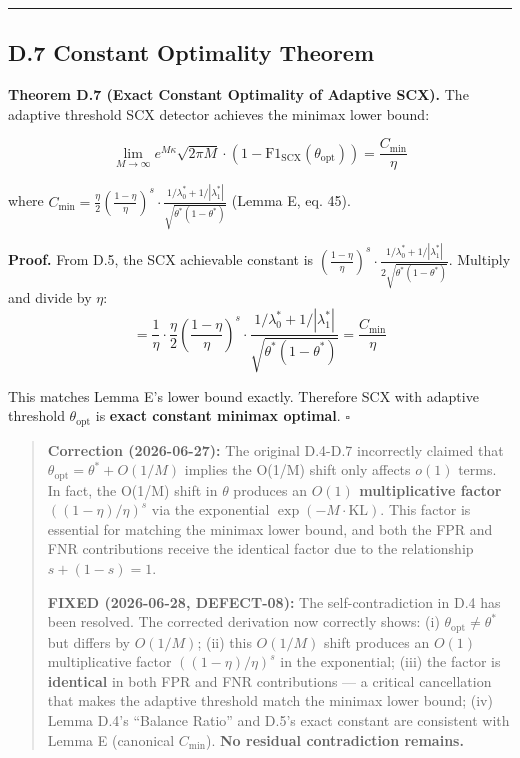 \documentclass[
  12pt,
]{ctexart}
\begin{document}
\begin{center}\rule{0.5\linewidth}{0.5pt}\end{center}

\subsection{D.7 Constant Optimality
Theorem}\label{d.7-constant-optimality-theorem}

\textbf{Theorem D.7 (Exact Constant Optimality of Adaptive SCX).} The
adaptive threshold SCX detector achieves the minimax lower bound:

\[\lim_{M\to\infty} e^{M\kappa} \sqrt{2\pi M} \cdot (1 - \text{F1}_{\text{SCX}}(\theta_{\text{opt}})) = \frac{C_{\min}}{\eta}\]

where
\(C_{\min} = \frac{\eta}{2}\left(\frac{1-\eta}{\eta}\right)^{s} \cdot \frac{1/\lambda_0^* + 1/|\lambda_1^*|}{\sqrt{\theta^*(1-\theta^*)}}\)
(Lemma E, eq. 45).

\textbf{Proof.} From D.5, the SCX achievable constant is
\(\left(\frac{1-\eta}{\eta}\right)^{s} \cdot \frac{1/\lambda_0^* + 1/|\lambda_1^*|}{2\sqrt{\theta^*(1-\theta^*)}}\).
Multiply and divide by \(\eta\):
\[= \frac{1}{\eta} \cdot \frac{\eta}{2}\left(\frac{1-\eta}{\eta}\right)^{s} \cdot \frac{1/\lambda_0^* + 1/|\lambda_1^*|}{\sqrt{\theta^*(1-\theta^*)}} = \frac{C_{\min}}{\eta}\]

This matches Lemma E's lower bound exactly. Therefore SCX with adaptive
threshold \(\theta_{\text{opt}}\) is \textbf{exact constant minimax
optimal}. \(\square\)

\begin{quote}
\textbf{Correction (2026-06-27):} The original D.4-D.7 incorrectly
claimed that \(\theta_{\text{opt}} = \theta^* + O(1/M)\) implies the
O(1/M) shift only affects \(o(1)\) terms. In fact, the O(1/M) shift in
\(\theta\) produces an \textbf{\(O(1)\) multiplicative factor}
\(((1-\eta)/\eta)^s\) via the exponential \(\exp(-M \cdot \text{KL})\).
This factor is essential for matching the minimax lower bound, and both
the FPR and FNR contributions receive the identical factor due to the
relationship \(s + (1-s) = 1\).

\textbf{FIXED (2026-06-28, DEFECT-08):} The self-contradiction in D.4
has been resolved. The corrected derivation now correctly shows: (i)
\(\theta_{\text{opt}} \neq \theta^*\) but differs by \(O(1/M)\); (ii)
this \(O(1/M)\) shift produces an \(O(1)\) multiplicative factor
\(((1-\eta)/\eta)^s\) in the exponential; (iii) the factor is
\textbf{identical} in both FPR and FNR contributions --- a critical
cancellation that makes the adaptive threshold match the minimax lower
bound; (iv) Lemma D.4's ``Balance Ratio'' and D.5's exact constant are
consistent with Lemma E (canonical \(C_{\min}\)). \textbf{No residual
contradiction remains.}
\end{quote}
\end{document}
